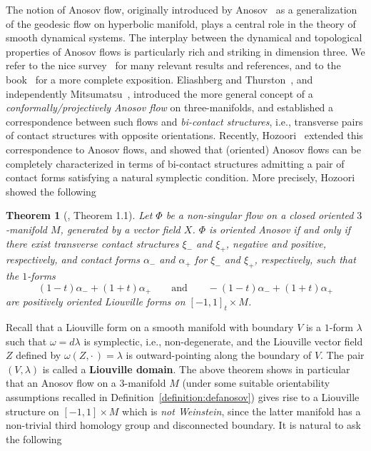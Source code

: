 \documentclass[letterpaper, 11pt]{article}
\numberwithin{equation}{section}
\newtheorem*{thm*}{Theorem}
\begin{document}
\medskip

The notion of Anosov flow, originally introduced by Anosov~\cite{A63, A67} as a generalization of the geodesic flow on hyperbolic manifold, plays a central role in the theory of smooth dynamical systems. The interplay between the dynamical and topological properties of Anosov flows is particularly rich and striking in dimension three. We refer to the nice survey~\cite{B17} for many relevant results and references, and to the book~\cite{FH19} for a more complete exposition. Eliashberg and Thurston~\cite{ET}, and independently Mitsumatsu~\cite{M95}, introduced the more general concept of a \emph{conformally/projectively Anosov flow} on three-manifolds, and established a correspondence between such flows and \emph{bi-contact structures}, i.e., transverse pairs of contact structures with opposite orientations. Recently, Hozoori~\cite{H22a} extended this correspondence to Anosov flows, and showed that (oriented) Anosov flows can be completely characterized in terms of bi-contact structures admitting a pair of contact forms satisfying a natural symplectic condition. More precisely, Hozoori showed the following

\begin{thm*}[\cite{H22a}, Theorem 1.1]
Let $\Phi$ be a non-singular flow on a closed oriented $3$-manifold $M$, generated by a vector field $X$. $\Phi$ is oriented Anosov if and only if there exist transverse contact structures $\xi_-$ and $\xi_+$, negative and positive, respectively, and contact forms $\alpha_-$ and $\alpha_+$ for $\xi_-$ and $\xi_+$, respectively, such that the $1$-forms $$ (1-t) \alpha_- + (1+t) \alpha_+ \qquad \textrm{and} \qquad  - (1-t) \alpha_- + (1+t) \alpha_+$$ are positively oriented Liouville forms on $[-1,1]_t \times M$.
\end{thm*}

Recall that a Liouville form on a smooth manifold with boundary $V$ is a $1$-form $\lambda$ such that $\omega = d \lambda$ is symplectic, i.e., non-degenerate, and the Liouville vector field $Z$ defined by $\omega(Z, \cdot \, ) = \lambda$ is outward-pointing along the boundary of $V$. The pair $(V, \lambda)$ is called a \textbf{Liouville domain}. The above theorem shows in particular that an Anosov flow on a $3$-manifold $M$ (under some suitable orientability assumptions recalled in Definition~\ref{definition:defanosov}) gives rise to a Liouville structure on $[-1,1] \times M$ which is \emph{not Weinstein}, since the latter manifold has a non-trivial third homology group and disconnected boundary. It is natural to ask the following
\end{document}

